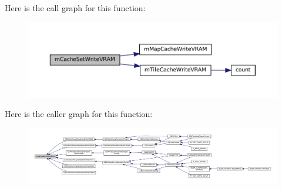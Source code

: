 Here is the call graph for this function\+:
\nopagebreak
\begin{figure}[H]
\begin{center}
\leavevmode
\includegraphics[width=350pt]{core_2cache-set_8c_ab75388da75a72f138ca6e24089fe5158_cgraph}
\end{center}
\end{figure}
Here is the caller graph for this function\+:
\nopagebreak
\begin{figure}[H]
\begin{center}
\leavevmode
\includegraphics[width=350pt]{core_2cache-set_8c_ab75388da75a72f138ca6e24089fe5158_icgraph}
\end{center}
\end{figure}
